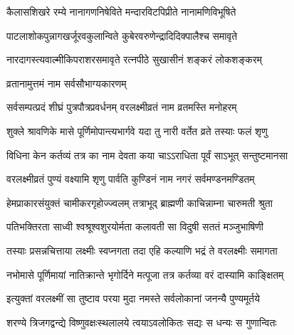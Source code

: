 


\twolineshloka
{कैलासशिखरे रम्ये नानागणनिषेविते}
{मन्दारविटपिप्रीते नानामणिविभूषिते} %

\twolineshloka
{पाटलाशोकपुन्नागखर्जूरवकुलान्विते}
{कुबेरवरुणेन्द्रादिदिक्पालैश्च समावृते} %

\twolineshloka
{नारदागस्त्यवाल्मीकिपराशरसमावृते}
{रत्नपीठे सुखासीनं शङ्करं लोकशङ्करम्} %






\onelineshloka
{व्रतानामुत्तमं नाम सर्वसौभाग्यकारणम्} %

\twolineshloka
{सर्वसम्पत्प्रदं शीघ्रं पुत्रपौत्रप्रवर्धनम्}
{वरलक्ष्मीव्रतं नाम व्रतमस्ति मनोहरम्} %

\twolineshloka
{शुक्ले श्रावणिके मासे पूर्णिमोपान्त्यभार्गवे}
{यदा तु नारी वर्तेत व्रते तस्याः फलं शृणु} %


\twolineshloka
{विधिना केन कर्तव्यं तत्र का नाम देवता}
{कया चाऽऽराधिता पूर्वं साऽभूत् सन्तुष्टमानसा} %


\twolineshloka
{वरलक्ष्मीव्रतं पुण्यं वक्ष्यामि शृणु पार्वति}
{कुण्डिनं नाम नगरं सर्वमण्डनमण्डितम्} %

\twolineshloka
{हेमप्राकारसंयुक्तं चामीकरगृहोज्ज्वलम्}
{तत्राभूद् ब्राह्मणी काचिन्नाम्ना चारुमती श्रुता} %

\twolineshloka
{पतिभक्तिरता साध्वी श्वश्रूश्वशुरयोर्मता}
{कलावती सा विदुषी सततं मञ्जुभाषिणी} %

\twolineshloka
{तस्याः प्रसन्नचित्ताया लक्ष्मीः स्वप्नगता तदा}
{एहि कल्याणि भद्रं ते वरलक्ष्मीः समागता} %

\twolineshloka
{नभोमासे पूर्णिमायां नातिक्रान्ते भृगोर्दिने}
{मत्पूजा तत्र कर्तव्या वरं दास्यामि काङ्क्षितम्} %

\twolineshloka
{इत्युक्तां वरलक्ष्मीं सा तुष्टाव परया मुदा}
{नमस्ते सर्वलोकानां जनन्यै पुण्यमूर्तये} %

\twolineshloka
{शरण्ये त्रिजगद्वन्द्ये विष्णुवक्षःस्थलालये}
{त्वयाऽवलोकितः सद्यः स धन्यः स गुणान्वितः} %

